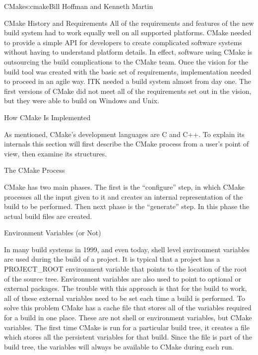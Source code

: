 \begin{aosachapter}{CMake}{s:cmake}{Bill Hoffman and Kenneth Martin}
\begin{aosasect1}{CMake History and Requirements}
All of the requirements and features of the new build system had to
work equally well on all supported platforms. CMake needed to provide
a simple API for developers to create complicated software systems
without having to understand platform details. In effect, software
using CMake is outsourcing the build complications to the CMake
team. Once the vision for the build tool was created with the basic
set of requirements, implementation needed to proceed in an agile way.
ITK needed a build system almost from day one. The first versions of
CMake did not meet all of the requirements set out in the vision, but
they were able to build on Windows and Unix.

\end{aosasect1}

\begin{aosasect1}{How CMake Is Implemented}

As mentioned, CMake's development languages are C and C++. To explain
its internals this section will first describe the CMake process from
a user's point of view, then examine its structures.

\begin{aosasect2}{The CMake Process}

CMake has two main phases. The first is the ``configure'' step, in which
CMake processes all the input given to it and creates an internal
representation of the build to be performed. Then next phase is the
``generate'' step. In this phase the actual build files are created.

\begin{aosasect3}{Environment Variables (or Not)}

In many build systems in 1999, and even today, shell level environment
variables are used during the build of a project. It is typical that a
project has a PROJECT\_ROOT environment variable that points to the
location of the root of the source tree.  Environment variables are
also used to point to optional or external packages. The trouble with
this approach is that for the build to work, all of these external
variables need to be set each time a build is performed. To solve this
problem CMake has a cache file that stores all of the variables
required for a build in one place. These are not shell or environment
variables, but CMake variables. The first time CMake is run for a
particular build tree, it creates a  file which
stores all the persistent variables for that build. Since the file is
part of the build tree, the variables will always be available to
CMake during each run.


\end{aosasect3}
\end{aosasect2}
\end{aosasect1}
\end{aosachapter}
